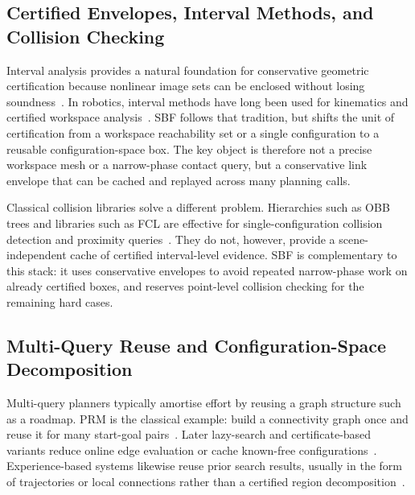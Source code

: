 \documentclass[journal]{IEEEtran}
\begin{document}
\subsection{Certified Envelopes, Interval Methods, and Collision Checking}

Interval analysis provides a natural foundation for conservative geometric
certification because nonlinear image sets can be enclosed without losing
soundness~\cite{moore2009introduction,jaulin2001applied}. In robotics, interval
methods have long been used for kinematics and certified workspace
analysis~\cite{merlet2004solving,merlet2006interval}. SBF follows that
tradition, but shifts the unit of certification from a workspace reachability
set or a single configuration to a reusable configuration-space box. The key
object is therefore not a precise workspace mesh or a narrow-phase contact
query, but a conservative link envelope that can be cached and replayed across
many planning calls.

Classical collision libraries solve a different problem. Hierarchies such as
OBB trees and libraries such as FCL are effective for single-configuration
collision detection and proximity queries~\cite{gottschalk1996obbtree,
pan2012fcl,gilbert1988fast}. They do not, however, provide a scene-independent
cache of certified interval-level evidence. SBF is complementary to this stack:
it uses conservative envelopes to avoid repeated narrow-phase work on already
certified boxes, and reserves point-level collision checking for the remaining
hard cases.

\subsection{Multi-Query Reuse and Configuration-Space Decomposition}

Multi-query planners typically amortise effort by reusing a graph structure such
as a roadmap. PRM is the classical example: build a connectivity graph once and
reuse it for many start-goal pairs~\cite{kavraki1996probabilistic,
bohlin2000path}. Later lazy-search and certificate-based variants reduce online
edge evaluation or cache known-free configurations~\cite{dellin2016unifying,
schmerling2015optimal}. Experience-based systems likewise reuse prior search
results, usually in the form of trajectories or local connections rather than a
certified region decomposition~\cite{coleman2014moveit}.
\end{document}
